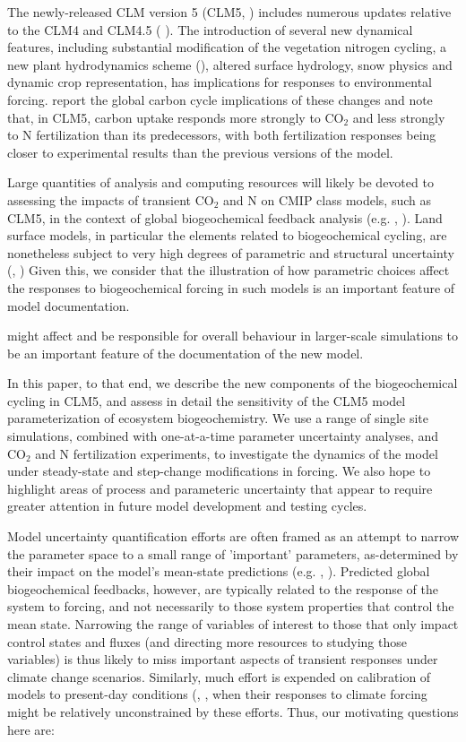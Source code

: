 \documentclass[draft,linenumbers]{agujournal}
\begin{document}
The newly-released CLM version 5  (CLM5, \cite{lawrence2018}) includes numerous updates relative to the CLM4 and CLM4.5  (\cite{oleson2013} ). The introduction of several new dynamical features, including substantial modification of the vegetation nitrogen cycling, a new plant hydrodynamics scheme (\cite{kennedy2019}), altered surface hydrology, snow physics and dynamic crop representation, has implications for responses to environmental forcing. \cite{wieder2019} report the global carbon cycle implications of these changes and note that, in CLM5, carbon uptake responds more strongly to CO$_{2}$ and less strongly to N fertilization than its predecessors, with both fertilization responses being closer to experimental results than the previous versions of the model. 

Large quantities of analysis and computing resources will likely be devoted to assessing the impacts of transient CO$_{2}$ and N on CMIP class models, such as CLM5, in the context of global biogeochemical feedback analysis (e.g. \cite{arora2013}, \cite{friedlingstein2014}). Land surface models, in particular the elements related to biogeochemical cycling, are nonetheless subject to very high degrees of parametric and structural uncertainty (\cite{bonan2018}, \cite{zaehle2014}) Given this,  we consider that the illustration of how parametric choices affect the responses to biogeochemical forcing in such models is an important feature of model documentation.

might affect and be responsible for overall behaviour in larger-scale simulations to be an important feature of the documentation of the new model.

In this paper, to that end, we describe the new components of the biogeochemical cycling in CLM5, and assess in detail the sensitivity of the CLM5 model parameterization of ecosystem biogeochemistry. We use a range of single site simulations, combined with one-at-a-time parameter uncertainty analyses, and CO$_{2}$ and N fertilization experiments, to investigate the dynamics of the model under steady-state and step-change modifications in forcing. We also hope to highlight areas of process and parameteric uncertainty that appear to require greater attention in future model development and testing cycles.

Model uncertainty quantification efforts are often framed as an attempt to narrow the parameter space to a small range of 'important' parameters, as-determined by their impact on the model's mean-state predictions (e.g. \cite{dietze2014}, \cite{ricciuto2018}).  Predicted global biogeochemical feedbacks, however, are typically related to the response of the system to forcing, and not necessarily to those system properties that control the mean state. Narrowing the range of variables of interest to those that only impact control states and fluxes (and directing more resources to studying those variables) is thus likely to miss important aspects of transient responses under climate change scenarios.  Similarly, much effort is expended on calibration of models to present-day conditions (\cite{fer2018}, \cite{lu2018}, when their responses to climate forcing might be relatively unconstrained by these efforts.  Thus, our motivating questions here are:
\end{document}
